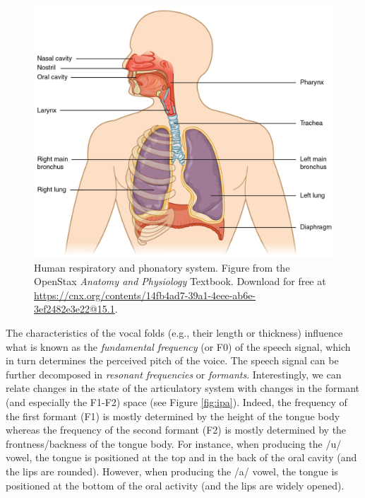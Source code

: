 \documentclass[a4paper,12pt,twoside,openright,oldfontcommands]{memoir}
\begin{document}
\begin{figure}[H]

{\centering \includegraphics[width=0.75\linewidth]{assets/vocal} 

}

\caption{Human respiratory and phonatory system. Figure from the OpenStax \textit{Anatomy and Physiology} Textbook. Download for free at \url{https://cnx.org/contents/14fb4ad7-39a1-4eee-ab6e-3ef2482e3e22@15.1}.}\label{fig:vocal}
\end{figure}

The characteristics of the vocal folds (e.g., their length or thickness) influence what is known as the \emph{fundamental frequency} (or F0) of the speech signal, which in turn determines the perceived pitch of the voice. The speech signal can be further decomposed in \emph{resonant frequencies} or \emph{formants}. Interestingly, we can relate changes in the state of the articulatory system with changes in the formant (and especially the F1-F2) space (see Figure \ref{fig:ipa}). Indeed, the frequency of the first formant (F1) is mostly determined by the height of the tongue body whereas the frequency of the second formant (F2) is mostly determined by the frontness/backness of the tongue body. For instance, when producing the /u/ vowel, the tongue is positioned at the top and in the back of the oral cavity (and the lips are rounded). However, when producing the /a/ vowel, the tongue is positioned at the bottom of the oral activity (and the lips are widely opened).
\end{document}
